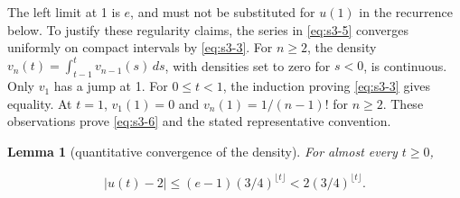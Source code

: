 \documentclass[10pt]{article}
\numberwithin{equation}{section}
\newtheorem{lemma}[theorem]{Lemma}
\theoremstyle{remark}
\begin{document}
The left limit at 1 is \(e\), and must not be substituted for \(u(1)\) in
the recurrence below. To justify these regularity claims, the series in
\eqref{eq:s3-5} converges uniformly on compact intervals by \eqref{eq:s3-3}. For \(n\ge2\),
the density \(v_n(t)=\int_{t-1}^t v_{n-1}(s)\,ds\), with densities set
to zero for \(s<0\), is continuous. Only \(v_1\) has a jump at 1. For
\(0\le t<1\), the induction proving \eqref{eq:s3-3} gives equality. At \(t=1\),
\(v_1(1)=0\) and \(v_n(1)=1/(n-1)!\) for \(n\ge2\). These observations
prove \eqref{eq:s3-6} and the stated representative convention.

\begin{lemma}[quantitative convergence of the density]\label{lem:4} For almost every
\(t\ge0\),

\begin{equation}
|u(t)-2|\le(e-1)(3/4)^{\lfloor t\rfloor}
<2(3/4)^{\lfloor t\rfloor}.
\label{eq:s3-7}
\end{equation}

\end{lemma}
\end{document}
